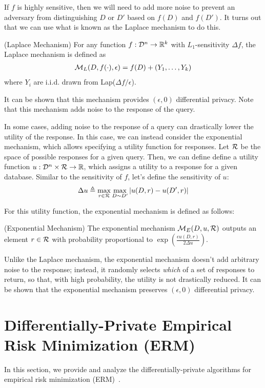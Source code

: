 \documentclass{article} %
\begin{document}
If $f$ is highly sensitive, then we will need to add more noise to prevent an
adversary from distinguishing $D$ or $D'$ based on $f(D)$ and $f(D')$. It turns
out that we can use what is known as the Laplace mechanism to do this.

\begin{definition}{(Laplace Mechanism)}
For any function $f : \mathcal{D}^n \rightarrow \mathbb{R}^k$ with $L_1$-sensitivity
$\Delta f$, the Laplace mechanism is defined as
\begin{align*}
\mathcal{M}_L(D, f(\cdot), \epsilon) = f(D) + (Y_1, \dots, Y_k)
\end{align*}
where $Y_i$ are i.i.d. drawn from Lap($\Delta f / \epsilon$).
\label{def:laplace_mechanism}
\end{definition}

It can be shown that this mechanism provides $(\epsilon, 0)$ differential
privacy. Note that this mechanism adds noise to the response of the query.

In some cases, adding noise to the response of a query can drastically lower
the utility of the response. In this case, we can instead consider the
exponential mechanism, which allows specifying a utility function for responses.
Let $\mathcal{R}$ be the space of possible responses for a given query. Then, we can
define define a utility function $u : \mathcal{D}^n \times \mathcal{R} \rightarrow \mathbb{R}$,
which assigns a utility to a response for a given database. Similar to the
sensitivity of $f$, let's define the sensitivity of $u$:
\begin{align*}
\Delta u \triangleq \max_{r \in \mathcal{R}} \max_{D \sim D'} \left\lvert u(D, r) - u(D', r)\right\rvert
\end{align*}

For this utility function, the exponential mechanism is defined as follows:
\begin{definition}{(Exponential Mechanism)}
The exponential mechanism $\mathcal{M}_E(D, u, \mathcal{R})$ outputs an element $r \in \mathcal{R}$ with
probability proportional to $\exp{(\frac{\epsilon u(D, r)}{2 \Delta u})}$.
\label{def:exponential_mechanism}
\end{definition}

Unlike the Laplace mechanism, the exponential mechanism doesn't add arbitrary
noise to the response; instead, it randomly selects \textit{which} of a set of
responses to return, so that, with high probability, the utility is not
drastically reduced. It can be shown that the exponential mechanism preserves
$(\epsilon, 0)$ differential privacy.

\section{Differentially-Private Empirical Risk Minimization (ERM)}\label{section:erm}
In this section, we provide and analyze the differentially-private algorithms for empirical risk minimization (ERM)~\cite{chaudhuri2011erm}.
\end{document}

